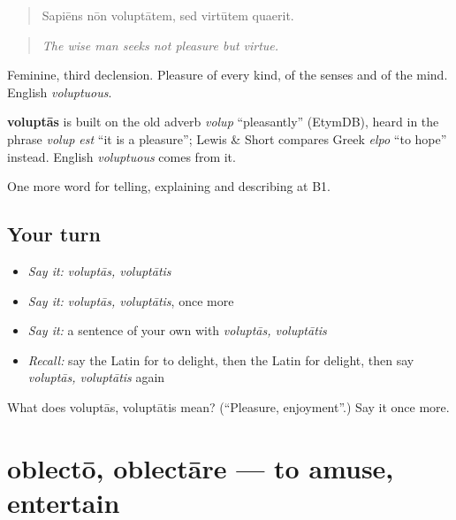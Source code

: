 \begin{quote}
Sapiēns nōn voluptātem, sed virtūtem quaerit.
\end{quote}

\begin{quote}
\emph{The wise man seeks not pleasure but virtue.}
\end{quote}

Feminine, third declension. Pleasure of every kind, of the senses and of the mind. English \emph{voluptuous}.

\begin{cousinweb}
\textbf{voluptās} is built on the old adverb \emph{volup} \textquotedblleft{}pleasantly\textquotedblright{} (EtymDB), heard in the phrase \emph{volup est} \textquotedblleft{}it is a pleasure\textquotedblright{}; Lewis \& Short compares Greek \emph{elpo} \textquotedblleft{}to hope\textquotedblright{} instead. English \emph{voluptuous} comes from it.
\end{cousinweb}

\begin{grammarlens}[title={What you've built}]
One more word for telling, explaining and describing at B1.
\end{grammarlens}

\subsection*{Your turn}
\begin{itemize}
\raggedright
  \item \emph{Say it:} \emph{voluptās, voluptātis}
  \item \emph{Say it:} \emph{voluptās, voluptātis}, once more
  \item \emph{Say it:} a sentence of your own with \emph{voluptās, voluptātis}
  \item \emph{Recall:} say the Latin for to delight, then the Latin for delight, then say \emph{voluptās, voluptātis} again
\end{itemize}

\begin{tcolorbox}[breakable,colback=teal!4,colframe=teal!35!black,title={Before you move on}]
What does voluptās, voluptātis mean? (\textquotedblleft{}Pleasure, enjoyment\textquotedblright{}.) Say it once more.
\end{tcolorbox}
\section[oblectō, oblectāre]{oblectō, oblectāre — to amuse, entertain}

